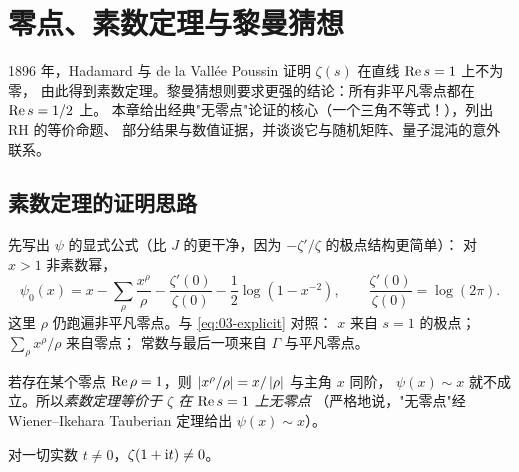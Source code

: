 \chapter{零点、素数定理与黎曼猜想}
\label{chap:zeros-pnt}

\begin{keybox}[本章要点]
1896 年，Hadamard 与 de la Vall\'ee Poussin 证明 $\zeta(s)$ 在直线 $\operatorname{Re} s=1$ 上不为零，
由此得到素数定理。黎曼猜想则要求更强的结论：所有非平凡零点都在 $\operatorname{Re} s=1/2$ 上。
本章给出经典"无零点"论证的核心（一个三角不等式！），列出 RH 的等价命题、
部分结果与数值证据，并谈谈它与随机矩阵、量子混沌的意外联系。
\end{keybox}

\section{素数定理的证明思路}
\label{sec:04-pnt}

先写出 $\psi$ 的显式公式（比 $J$ 的更干净，因为 $-\zeta'/\zeta$ 的极点结构更简单）：
对 $x>1$ 非素数幂，
\begin{equation}\label{eq:04-psi-explicit}
  \psi_0(x)=x-\sum_{\rho}\frac{x^{\rho}}{\rho}
  -\frac{\zeta'(0)}{\zeta(0)}-\frac12\log\!\left(1-x^{-2}\right),
  \qquad \frac{\zeta'(0)}{\zeta(0)}=\log(2\pi).
\end{equation}
这里 $\rho$ 仍跑遍非平凡零点。与 \cref{eq:03-explicit} 对照：
$x$ 来自 $s=1$ 的极点；$\sum_\rho x^\rho/\rho$ 来自零点；
常数与最后一项来自 $\Gamma$ 与平凡零点。

若存在某个零点 $\operatorname{Re}\rho=1$，则 $\left\lvert x^\rho/\rho\right\rvert=x/\left\lvert \rho\right\rvert$ 与主角 $x$ 同阶，
$\psi(x)\sim x$ 就不成立。所以\emph{素数定理等价于 $\zeta$ 在 $\operatorname{Re} s=1$ 上无零点}
（严格地说，"无零点"经 Wiener--Ikehara Tauberian 定理给出 $\psi(x)\sim x$）。

\begin{theorem}\label{thm:04-nonvanishing}
对一切实数 $t\ne0$，$\zeta(1+\mathrm{i} t)\ne0$。
\end{theorem}

